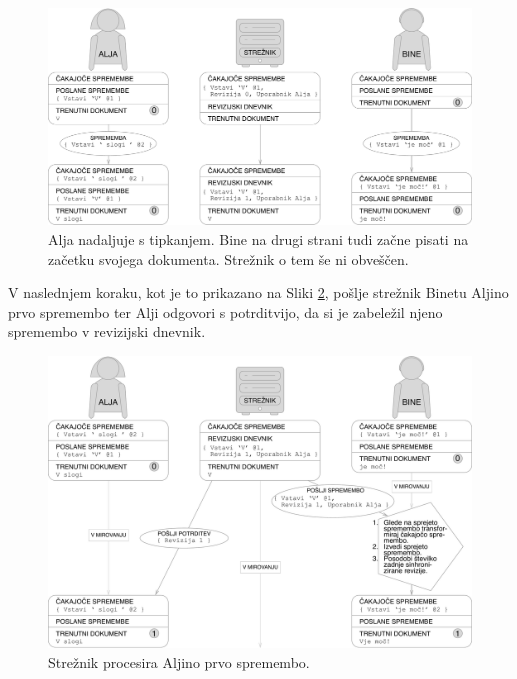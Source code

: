 \documentclass[a4paper, 12pt, twoside]{book}
\begin{document}
\begin{figure}[placement h]
\begin{center}
\includegraphics[width=16cm]{img/pc2.pdf}
\end{center}
\caption{Alja nadaljuje s tipkanjem. Bine na drugi strani tudi začne pisati na začetku svojega dokumenta. Strežnik o tem še ni obveščen.}
\label{pc2}
\end{figure}

\pagebreak

V naslednjem koraku, kot je to prikazano na Sliki \ref{pc3}, pošlje strežnik Binetu Aljino prvo spremembo ter Alji odgovori s potrditvijo, da si je zabeležil njeno spremembo v revizijski dnevnik.

\begin{figure}[placement h]
\begin{center}
\includegraphics[width=16cm]{img/pc3.pdf}
\end{center}
\caption{Strežnik procesira Aljino prvo spremembo.}
\label{pc3}
\end{figure}
\end{document}
